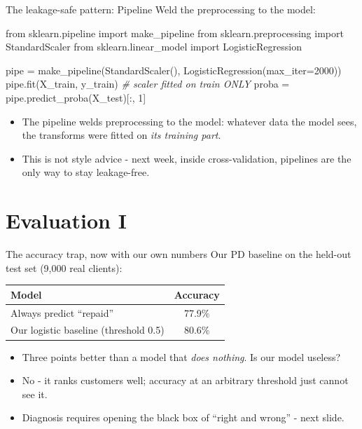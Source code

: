 \documentclass[10pt,aspectratio=169]{beamer}
\begin{document}
\begin{frame}[fragile]{The leakage-safe pattern: Pipeline}
\small Weld the preprocessing to the model:
{\footnotesize
\begin{semiverbatim}
from sklearn.pipeline import make_pipeline
from sklearn.preprocessing import StandardScaler
from sklearn.linear_model import LogisticRegression

pipe = make_pipeline(StandardScaler(),
                     LogisticRegression(max_iter=2000))
pipe.fit(X_train, y_train)           \textit{\# scaler fitted on train ONLY}
proba = pipe.predict_proba(X_test)[:, 1]
\end{semiverbatim}}
  \vspace{0.4em}
  \begin{itemize}\small
    \item The pipeline welds preprocessing to the model: whatever data the
          model sees, the transforms were fitted on \emph{its training part}.
    \item This is not style advice - next week, inside cross-validation,
          pipelines are the \alert{only} way to stay leakage-free.
  \end{itemize}
\end{frame}

\section{Evaluation I}

\begin{frame}{The accuracy trap, now with our own numbers}
  Our PD baseline on the held-out test set (9{,}000 real clients):
  \begin{center}
  \begin{tabular}{@{}lc@{}}
    \toprule
    Model & Accuracy \\
    \midrule
    Always predict ``repaid'' & 77.9\% \\
    Our logistic baseline (threshold 0.5) & \alert{80.6\%} \\
    \bottomrule
  \end{tabular}
  \end{center}
  \vspace{0.5em}
  \begin{itemize}\small
    \item Three points better than a model that \emph{does nothing}.
          Is our model useless?
    \item No - it \alert{ranks} customers well; accuracy at an arbitrary
          threshold just cannot see it.
    \item Diagnosis requires opening the black box of ``right and wrong''
          - next slide.
  \end{itemize}
\end{frame}
\end{document}
